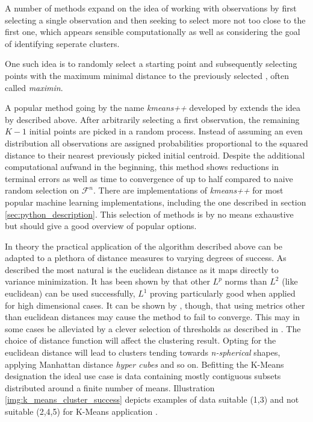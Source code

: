 A number of methods expand on the idea of working with observations by first selecting a single observation and then seeking to select more not too close to the first one, which appears sensible computationally as well as considering the goal of identifying seperate clusters.

One such idea is to randomly select a starting point and subsequently selecting points with the maximum minimal distance to the previously selected \cite{gonzalez1985clustering}, often called \textit{maximin}.

A popular method going by the name \textit{kmeans++} developed by \cite{arthur2006k} extends the idea by \cite{macqueen1967some} described above. After arbitrarily selecting a first observation, the remaining $K-1$ initial points are picked in a random process. Instead of assuming an even distribution all observations are assigned probabilities proportional to the squared distance to their nearest previously picked initial centroid. Despite the additional computational aufwand in the beginning, this method shows reductions in terminal errors as well as time to convergence of up to half compared to naive random selection on $\mathcal{F}^{n}$. There are implementations of \textit{kmeans++} for most popular machine learning implementations, including the one described in section \ref{sec:python_description}.
This selection of methods is by no means exhaustive but should give a good overview of popular options.

 In theory the practical application of the algorithm described above can be adapted to a plethora of distance measures to varying degrees of success. As described the most natural is the euclidean distance as it maps directly to variance minimization. It has been shown by \cite{aggarwal2001surprising} that other $L^{p}$ norms than $L^{2}$ (like euclidean) can be used successfully, $L^{1}$ proving particularly good when applied for high dimensional cases. It can be shown by \cite{selim1984k}, though, that using metrics other than euclidean distances may cause the method to fail to converge. This may in some cases be alleviated by a clever selection of thresholds as described in .
The choice of distance function will affect the clustering result. Opting for the euclidean distance will lead to clusters tending towards \textit{n-spherical} shapes, applying Manhattan distance \textit{hyper cubes} and so on. Befitting the K-Means designation the ideal use case is data containing mostly contiguous subsets distributed around a finite number of means. Illustration \ref{img:k_means_cluster_success} depicts examples of data suitable (1,3) and not suitable (2,4,5) for K-Means application \cite{sklearn_website}.

